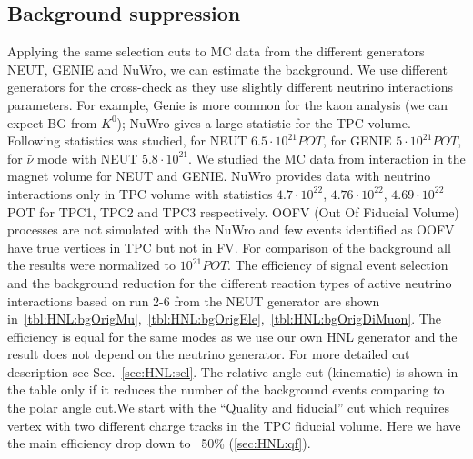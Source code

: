 \documentclass[../main.tex]{subfiles}
\begin{document}
\subsection{Background suppression}
\label{sec:HNL:bg}
Applying the same selection cuts to MC data from the different generators NEUT, GENIE and NuWro, we can estimate the background. We use different generators for the cross-check as they use slightly different neutrino interactions parameters. For example, Genie is more common for the kaon analysis (we can expect BG from $K^0$); NuWro gives a large statistic for the TPC volume. Following statistics was studied, for NEUT $6.5\cdot 10^{21} POT$, for GENIE $5\cdot 10^{21}POT$, for $\bar{\nu}$ mode with NEUT $5.8\cdot 10^{21}$. We studied the MC data from interaction in the magnet volume for NEUT and GENIE. NuWro provides data with neutrino interactions only in TPC volume with statistics $4.7\cdot10^{22}$, $4.76\cdot10^{22}$, $4.69\cdot10^{22}$ POT for TPC1, TPC2 and TPC3 respectively. OOFV (Out Of Fiducial Volume) processes are not simulated with the NuWro and few events identified as OOFV have true vertices in TPC but not in FV. For comparison of the background all the results were normalized to $10^{21}POT$. The efficiency of signal event selection and the background reduction for the different reaction types of active neutrino interactions based on run 2-6 from the NEUT generator are shown in~\autoref{tbl:HNL:bgOrigMu},~\autoref{tbl:HNL:bgOrigEle},~\autoref{tbl:HNL:bgOrigDiMuon}. The efficiency is equal for the same modes as we use our own HNL generator and the result does not depend on the neutrino generator. For more detailed cut description see Sec.~\ref{sec:HNL:sel}. The relative angle cut (kinematic) is shown in the table only if it reduces the number of the background events comparing to the polar angle cut.We start with the ``Quality and fiducial'' cut which requires  vertex with two different charge tracks in the TPC fiducial volume. Here we have the main efficiency drop down to ~50\% (\autoref{sec:HNL:qf}).
\end{document}
